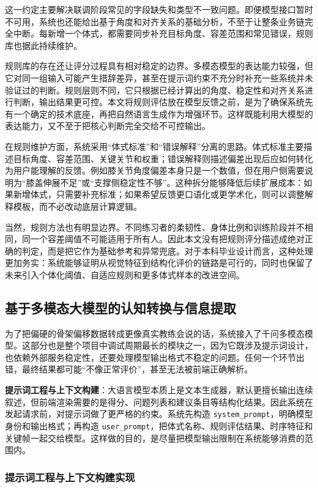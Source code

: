 \documentclass[UTF8,twoside]{ctexrep}
\makeatletter
\def@NAT@last@yr{\@citea}%
\def@NAT@last@yr{-\NAT@penalty}%
\makeatother
\begin{document}
这一约定主要解决联调阶段常见的字段缺失和类型不一致问题。即便模型接口暂时不可用，系统也还能给出基于角度和对齐关系的基础分析，不至于让整条业务链完全中断。每新增一个体式，都需要同步补充目标角度、容差范围和常见错误，规则库也据此持续维护。

规则库的存在还让评分过程具有相对稳定的边界。多模态模型的表达能力较强，但它对同一组输入可能产生措辞差异，甚至在提示词约束不充分时补充一些系统并未验证过的判断。规则层则不同，它只根据已经计算出的角度、稳定性和对齐关系进行判断，输出结果更可控。本文将规则评估放在模型反馈之前，是为了确保系统先有一个确定的技术底座，再把自然语言生成作为增强环节。这样既能利用大模型的表达能力，又不至于把核心判断完全交给不可控输出。

在规则维护方面，系统采用“体式标准”和“错误解释”分离的思路。体式标准主要描述目标角度、容差范围、关键关节和权重；错误解释则描述偏差出现后应如何转化为用户能理解的反馈。例如膝关节角度偏差本身只是一个数值，但在用户侧需要说明为“膝盖伸展不足”或“支撑侧稳定性不够”。这种拆分能够降低后续扩展成本：如果新增体式，只需要补充标准；如果希望反馈更口语化或更学术化，则可以调整解释模板，而不必改动底层计算逻辑。

当然，规则方法也有明显边界。不同练习者的柔韧性、身体比例和训练阶段并不相同，同一个容差阈值不可能适用于所有人。因此本文没有把规则评分描述成绝对正确的判定，而是把它作为基础参考和异常兜底。对于本科毕业设计而言，这种处理更加务实：系统能够证明从视觉特征到结构化评价的链路是可行的，同时也保留了未来引入个体化阈值、自适应规则和更多体式样本的改进空间。

\subsection{基于多模态大模型的认知转换与信息提取}
为了把偏硬的骨架偏移数据转成更像真实教练会说的话，系统接入了千问多模态模型。这部分也是整个项目中调试周期最长的模块之一，因为它既涉及提示词设计，也依赖外部服务稳定性，还要处理模型输出格式不稳定的问题。任何一个环节出错，最终结果都可能“不像正常评价”，甚至无法被前端正确解析。

\textbf{提示词工程与上下文构建}：大语言模型本质上是文本生成器，默认更擅长输出连续叙述，但前端渲染需要的是得分、问题列表和建议条目等结构化结果。因此系统在发起请求前，对提示词做了更严格的约束。系统先构造 \texttt{system\_prompt}，明确模型身份和输出格式；再构造 \texttt{user\_prompt}，把体式名称、规则评估结果、时序特征和关键帧一起交给模型。这样做的目的，是尽量把模型输出限制在系统能够消费的范围内。

\subsubsection{提示词工程与上下文构建实现}
\end{document}
